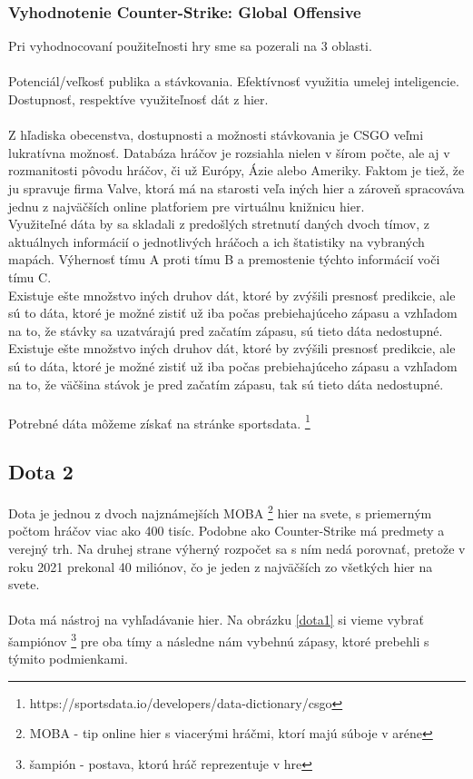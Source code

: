  

 \subsubsection{Vyhodnotenie Counter-Strike: Global Offensive}
 Pri vyhodnocovaní použiteľnosti hry sme sa pozerali na 3 oblasti. \\ \\ Potenciál/veľkosť publika a stávkovania. Efektívnosť využitia umelej inteligencie. Dostupnosť, respektíve využiteľnosť dát z hier. \\ \\
 Z hľadiska obecenstva, dostupnosti a možnosti stávkovania je CSGO veľmi lukratívna možnosť. Databáza hráčov je rozsiahla nielen v šírom počte, ale aj v rozmanitosti pôvodu hráčov, či už Európy, Ázie alebo Ameriky. Faktom je tiež, že ju spravuje firma Valve, ktorá má na starosti veľa iných hier a zároveň spracováva jednu z najväčších online platforiem pre virtuálnu knižnicu hier. \\
 Využiteľné dáta by sa skladali z predošlých stretnutí daných dvoch tímov, z aktuálnych informácií o jednotlivých hráčoch a ich štatistiky na vybraných mapách. Výhernosť tímu A proti tímu B a premostenie týchto informácií voči tímu C.\\
 Existuje ešte množstvo iných druhov dát, ktoré by zvýšili presnosť predikcie, ale sú to dáta, ktoré je možné zistiť už iba počas prebiehajúceho zápasu a vzhľadom na to, že stávky sa uzatvárajú pred začatím zápasu, sú tieto dáta nedostupné.
  Existuje ešte množstvo iných druhov dát, ktoré by zvýšili presnosť predikcie, ale sú to dáta, ktoré je možné zistiť už iba počas prebiehajúceho zápasu a vzhľadom na to, že väčšina stávok je pred začatím zápasu, tak sú tieto dáta nedostupné.
 \\ \\
 Potrebné dáta môžeme získať na stránke sportsdata. \footnote {
 https://sportsdata.io/developers/data-dictionary/csgo
}


\subsection{Dota 2}
Dota je jednou z dvoch najznámejších MOBA \footnote {
	MOBA - tip online hier s viacerými hráčmi, ktorí majú súboje v aréne
} hier na svete, s priemerným počtom hráčov viac ako 400 tisíc. \cite{dotaplayers} Podobne ako Counter-Strike má predmety a verejný trh. Na druhej strane výherný rozpočet sa s ním nedá porovnať, pretože v roku 2021 prekonal 40 miliónov, čo je jeden z najväčších zo všetkých hier na svete. \cite{dotaprizepool}
\\ \\
Dota má nástroj na vyhľadávanie hier. Na obrázku \ref{dota1} si vieme vybrať šampiónov \footnote {
	šampión - postava, ktorú hráč reprezentuje v hre
} pre oba tímy a následne nám vybehnú zápasy, ktoré prebehli s týmito podmienkami.

